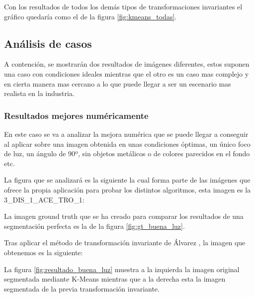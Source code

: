 
Con los resultados de todos los demás tipos de transformaciones invariantes el gráfico quedaría como el de la figura \ref{fig:kmeans_todas}.

\subsection{Análisis de casos}\label{análisis-de-casos}

A contención, se mostrarán dos resultados de imágenes diferentes, estos suponen una caso con condiciones ideales mientras que el otro es un caso mas complejo y en cierta manera mas cercano a lo que puede llegar a ser un escenario mas realista en la industria.

\subsubsection{Resultados mejores numéricamente}\label{resultados-mejores-numéricamente}

En este caso se va a analizar la mejora numérica que se puede llegar a conseguir al aplicar sobre una imagen obtenida en unas condiciones óptimas, un único foco de luz, un ángulo de 90º, sin objetos metálicos o de colores parecidos en el fondo etc.

La figura que se analizará es la siguiente la cual forma parte de las imágenes que ofrece la propia aplicación para probar los distintos algoritmos, esta imagen es la 3\_DIS\_1\_ACE\_TRO\_1:


La imagen ground truth que se ha creado para comparar los resultados de una segmentación perfecta es la de la figura \ref{fig:gt_buena_luz}.


Tras aplicar el método de transformación invariante de Álvarez \cite{alvarez2011}, la imagen que obtenemos es la siguiente:


La figura \ref{fig:resultado_buena_luz} muestra a la izquierda la imagen original segmentada mediante K-Means mientras que a la derecha esta la imagen segmentada de la previa transformación invariante.

